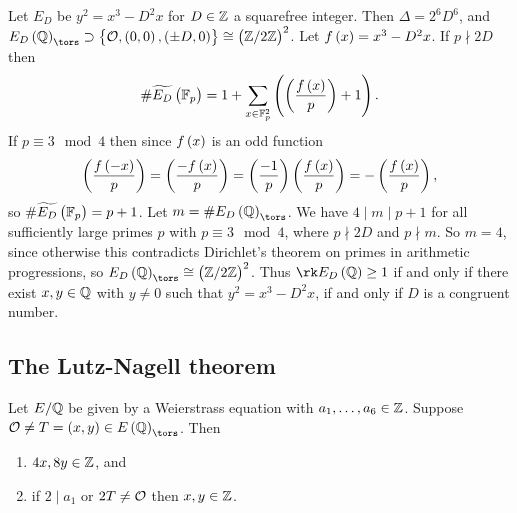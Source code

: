 \begin{example*}
Let $ E_D $ be $ y^2 = x^3 - D^2x $ for $ D \in \mathbb{Z} $ a squarefree integer. Then $ \Delta = 2^6D^6 $, and $ E_D\br{\QQ}_{\tors} \supset \cbr{\OOO, \br{0, 0}, \br{\pm D, 0}} \cong \br{\ZZ / 2\ZZ}^2 $. Let $ f\br{x} = x^3 - D^2x $. If $ p \nmid 2D $ then
$$ \#\widetilde{E_D}\br{\FF_p} = 1 + \sum_{x \in \FF_p^2} \br{\br{\dfrac{f\br{x}}{p}} + 1}. $$
If $ p \equiv 3 \mod 4 $ then since $ f\br{x} $ is an odd function
$$ \br{\dfrac{f\br{-x}}{p}} = \br{\dfrac{-f\br{x}}{p}} = \br{\dfrac{-1}{p}}\br{\dfrac{f\br{x}}{p}} = -\br{\dfrac{f\br{x}}{p}}, $$
so $ \#\widetilde{E_D}\br{\FF_p} = p + 1 $. Let $ m = \#E_D\br{\QQ}_{\tors} $. We have $ 4 \mid m \mid p + 1 $ for all sufficiently large primes $ p $ with $ p \equiv 3 \mod 4 $, where $ p \nmid 2D $ and $ p \nmid m $. So $ m = 4 $, since otherwise this contradicts Dirichlet's theorem on primes in arithmetic progressions, so $ E_D\br{\QQ}_{\tors} \cong \br{\ZZ / 2\ZZ}^2 $. Thus $ \rk E_D\br{\QQ} \ge 1 $ if and only if there exist $ x, y \in \mathbb{Q} $ with $ y \ne 0 $ such that $ y^2 = x^3 - D^2x $, if and only if $ D $ is a congruent number.
\end{example*}

\pagebreak

\subsection{The Lutz-Nagell theorem}

\begin{lemma}
\label{lem:10.4}
Let $ E / \mathbb{Q} $ be given by a Weierstrass equation with $ a_1, \dots, a_6 \in \mathbb{Z} $. Suppose $ \OOO \ne T = \br{x, y} \in E\br{\QQ}_{\tors} $. Then
\begin{enumerate}
\item $ 4x, 8y \in \mathbb{Z} $, and
\item if $ 2 \mid a_1 $ or $ 2T \ne \mathcal{O} $ then $ x, y \in \mathbb{Z} $.
\end{enumerate}
\end{lemma}

